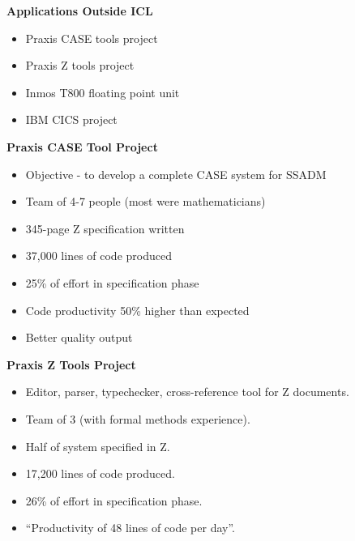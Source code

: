 \begin{slide}{}

\begin{center}
{\bf {Applications Outside ICL}}
\end{center}

\begin{itemize}
\item
Praxis CASE tools project
\item
Praxis Z tools project
\item
Inmos T800 floating point unit
\item
IBM CICS project
\end{itemize}

\end{slide}
\begin{slide}{}
\begin{center}

{\bf  Praxis CASE Tool Project}

\end{center}

\begin{itemize}
\item
Objective - to develop a complete CASE system for SSADM
\item
Team of 4-7 people (most were mathematicians)
\item
345-page Z specification written
\item
37,000 lines of code produced
\item
25\% of effort in specification phase
\item
Code productivity 50\% higher than expected
\item
Better quality output
\end{itemize}

\end{slide}


\begin{slide}{}
\begin{center}
{\bf  Praxis Z Tools Project}
\end{center}

\begin{itemize}
\item
Editor, parser, typechecker, cross-reference tool for Z documents.
\item
Team of 3 (with formal methods experience).
\item
Half of system specified in Z.
\item
17,200 lines of code produced.
\item
26\% of effort in specification phase.
\item
``Productivity of 48 lines of code per day''.
\end{itemize}


\end{slide}

